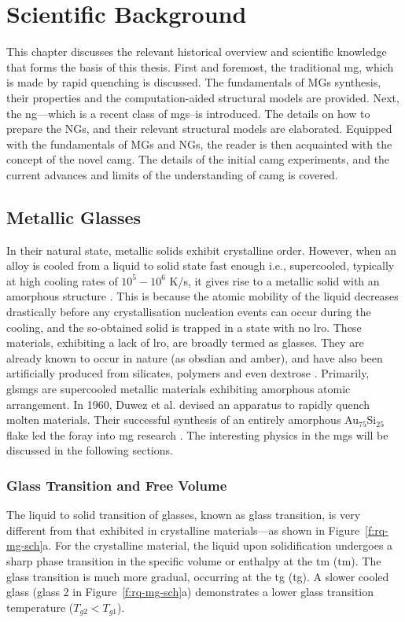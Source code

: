 \chapter{Scientific Background} \label{c:theory}
This chapter discusses the relevant historical overview and scientific knowledge that forms the basis of this thesis. First and foremost, the traditional \gls{mg}, which is made by rapid quenching is discussed. The fundamentals of MGs synthesis, their properties and the computation-aided structural models are provided. Next, the \gls{ng}---which is a recent class of \glspl{mg}--is introduced. The details on how to prepare the NGs, and their relevant structural models are elaborated. Equipped with the fundamentals of MGs and NGs, the reader is then acquainted with the concept of the novel \gls{camg}. The details of the initial \gls{camg} experiments, and the current advances and limits of the understanding of \gls{camg} is covered.  \par 

\section{Metallic Glasses} \label{s:mg}
In their natural state, metallic solids exhibit crystalline order. However, when an alloy is cooled from a liquid to solid state fast enough i.e., supercooled, typically at high cooling rates of $10^5-10^6$ K/s, it gives rise to a metallic solid with an amorphous structure \cite{Debenedetti2001}. This is because the atomic mobility of the liquid decreases drastically before any crystallisation nucleation events can occur during the cooling, and the so-obtained solid is trapped in a state with no \gls{lro}. These materials, exhibiting a lack of \gls{lro}, are broadly termed as glasses. They are already known to occur in nature (as obsdian and amber), and have also been artificially produced from silicates, polymers and even dextrose \cite{Doremus1994,Berthier2016}. Primarily, gls{mg}s are supercooled metallic materials exhibiting amorphous atomic arrangement. In 1960, Duwez et al. \cite{Klement1960,Duwez1960} devised an apparatus to rapidly quench molten materials. Their successful synthesis of an entirely amorphous \mbox{Au$_{75}$Si$_{25}$} flake led the foray into \gls{mg} research \cite{Klement1960}. The interesting physics in the \gls{mg}s will be discussed in the following sections. \par

\subsection{Glass Transition and Free Volume} \label{s:gt-fv}
The liquid to solid transition of glasses, known as glass transition, is very different from that exhibited in crystalline materials---as shown in Figure~\ref{f:rq-mg-sch}a. For the crystalline material, the liquid upon solidification undergoes a sharp phase transition in the specific volume or enthalpy at the \glsdesc{tm} (\gls{tm}). The glass transition is much more gradual, occurring at the \glsdesc{tg} (\gls{tg}).  A slower cooled glass (glass 2 in Figure~\ref{f:rq-mg-sch}a) demonstrates a lower glass transition temperature ($T_{g2} < T_{g1}$). \par

